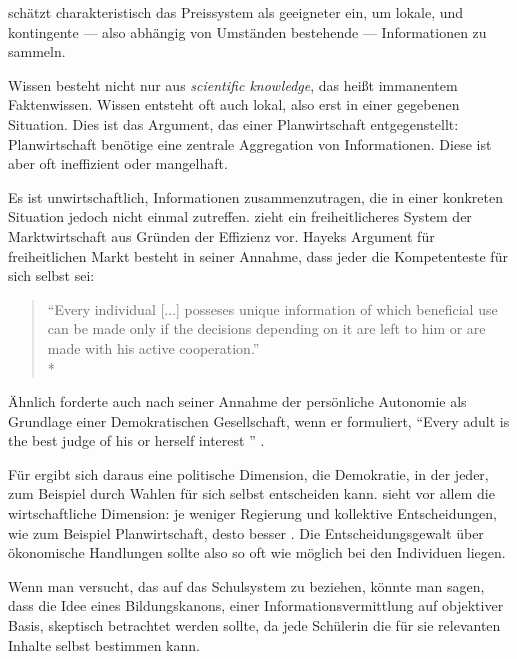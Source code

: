 \citeauthor{hayek-1945} schätzt charakteristisch das Preissystem als geeigneter ein, um lokale, und kontingente --- also abhängig von Umständen bestehende --- Informationen zu sammeln.

Wissen besteht nicht nur aus \emph{scientific knowledge}, das heißt immanentem Faktenwissen.
Wissen entsteht oft auch lokal, also erst in einer gegebenen Situation.
Dies ist das Argument, das \citeauthor{hayek-1945} einer Planwirtschaft entgegenstellt:
Planwirtschaft benötige eine zentrale Aggregation von Informationen.
Diese ist aber oft ineffizient oder mangelhaft.

Es ist unwirtschaftlich, Informationen zusammenzutragen, die in einer konkreten Situation jedoch nicht einmal zutreffen.
\citeauthor{hayek-1945} zieht ein freiheitlicheres System der Marktwirtschaft aus Gründen der Effizienz vor.
Hayeks Argument für freiheitlichen Markt besteht in seiner Annahme, dass jeder die Kompetenteste für sich selbst sei:

\begin{quote}
	``Every individual [...] posseses unique information of which beneficial use can be made only if the decisions depending on it are left to him or are made with his active cooperation.''\\*
	\textcite[521]{hayek-1945}
\end{quote}

Ähnlich forderte \citeauthor{Dahl-1989-aa} auch nach seiner Annahme der persönliche Autonomie als Grundlage einer Demokratischen Gesellschaft, wenn er formuliert,
``Every adult is the best judge of his or herself interest '' \parencite[100]{Dahl-1989-aa}.

Für \citeauthor{Dahl-1989-aa} ergibt sich daraus eine politische Dimension, die Demokratie, in der jeder, zum Beispiel durch Wahlen für sich selbst entscheiden kann.
\citeauthor{hayek-1945} sieht vor allem die wirtschaftliche Dimension: je weniger Regierung und kollektive Entscheidungen, wie zum Beispiel Planwirtschaft, desto besser \parencite[527f.]{hayek-1945}.
Die Entscheidungsgewalt über ökonomische Handlungen sollte also so oft wie möglich bei den Individuen liegen.

Wenn man versucht, das auf das Schulsystem zu beziehen, könnte man sagen, dass die Idee eines Bildungskanons, einer Informationsvermittlung auf objektiver Basis, skeptisch betrachtet werden sollte, da jede Schülerin die für sie relevanten Inhalte selbst bestimmen kann.
